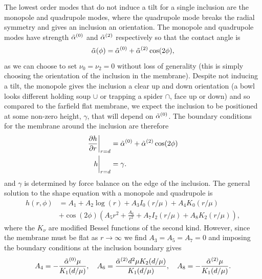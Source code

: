 The lowest order modes that do not induce a tilt for a single inclusion are the monopole and quadrupole modes, where the quadrupole mode breaks the radial symmetry and gives an inclusion an orientation. The monopole and quadrupole modes have strength $\Tilde{\alpha}^{(0)}$ and $\Tilde{\alpha}^{(2)}$ respectively so that the contact angle is
\begin{equation}
\Tilde{\alpha}(\phi) = \Tilde{\alpha}^{(0)} + \Tilde{\alpha}^{(2)}\cos(2\phi),
\end{equation}
as we can choose to set $\nu_0=\nu_2=0$ without loss of generality (this is simply choosing the orientation of the inclusion in the membrane). Despite not inducing a tilt, the monopole gives the inclusion a clear up and down orientation (a bowl looks different holding soup $\cup$ or trapping a spider $\cap$, face up or down) and so compared to the farfield flat membrane, we expect the inclusion to be positioned at some non-zero height, $\gamma$, that will depend on $\Tilde{\alpha}^{(0)}$. The boundary conditions for the membrane around the inclusion are therefore
\begin{equation}
\begin{split}
    \frac{\partial h}{\partial r}\bigg\rvert_{r=d} &= \Tilde{\alpha}^{(0)} + \Tilde{\alpha}^{(2)}\cos(2\phi) \\
    h \bigg\rvert_{r=d} &= \gamma.
\end{split}
\end{equation}
and $\gamma$ is determined by force balance on the edge of the inclusion. The general solution to the shape equation with a monopole and quadrupole is
\begin{equation}
\begin{split}
    h(r, \phi) &= A_{1}+A_{2}\log(r)+A_{3}I_{0}(r/\mu)+A_{4}K_{0}(r/\mu) \\
    &+ \cos(2\phi)\left(A_{5}r^2+\frac{A_{6}}{r^2}+A_{7}I_{2}(r/\mu)+A_{8}K_{2}(r/\mu)\right),
\end{split}
\end{equation}
where the $K_\nu$ are modified Bessel functions of the second kind. However, since the membrane must be flat as $r\to\infty$ we find $A_{3} = A_{5} = A_{7} = 0$ and imposing the boundary conditions at the inclusion boundary gives
\begin{equation}
    A_4 = -\frac{\Tilde{\alpha}^{(0)}\mu}{K_{1}(d/\mu)},\quad A_6 = \frac{\Tilde{\alpha}^{(2)} d^2 \mu K_{2}(d/\mu)}{K_{1}(d/\mu)},\quad A_8 = -\frac{\Tilde{\alpha}^{(2)} \mu}{K_{1}(d/\mu)}.
\end{equation}

